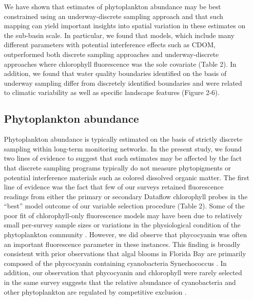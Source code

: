 \documentclass[review]{elsarticle}
\begin{document}
We have shown that estimates of phytoplankton abundance may be best constrained using an underway-discrete sampling approach and that such mapping can yield important insights into spatial variation in these estimates on the sub-basin scale. In particular, we found that models, which include many different parameters with potential interference effects such as CDOM, outperformed both discrete sampling approaches and underway-discrete approaches where chlorophyll fluorescence was the sole covariate (Table 2). In addition, we found that water quality boundaries identified on the basis of underway sampling differ from discretely identified boundaries and were related to climatic variability as well as specific landscape features (Figure 2-6).

\subsection{Phytoplankton abundance}

Phytoplankton abundance is typically estimated on the basis of strictly discrete sampling within long-term monitoring networks. In the present study, we found two lines of evidence to suggest that such estimates may be affected by the fact that discrete sampling programs typically do not measure phytopigments or potential interference materials such as colored dissolved organic matter. The first line of evidence was the fact that few of our surveys retained fluorescence readings from either the primary or secondary Dataflow chlorophyll probes in the “best” model outcome of our variable selection procedure (Table 2). Some of the poor fit of chlorophyll-only fluorescence models may have been due to relatively small per-survey sample sizes or variations in the physiological condition of the phytoplankton community \citep{goldman2013estimation}. However, we did observe that phycocyanin was often an important fluorescence parameter in these instances. This finding is broadly consistent with prior observations that algal blooms in Florida Bay are primarily composed of the phycocyanin containing cyanobacteria Synechococcus \citep{phlips_blooms_1999, shangguan2017phytoplankton}. In addition, our observation that phycocyanin and chlorophyll were rarely selected in the same survey suggests that the relative abundance of cyanobacteria and other phytoplankton are regulated by competitive exclusion \citep{passarge2006competition}. 
\end{document}
